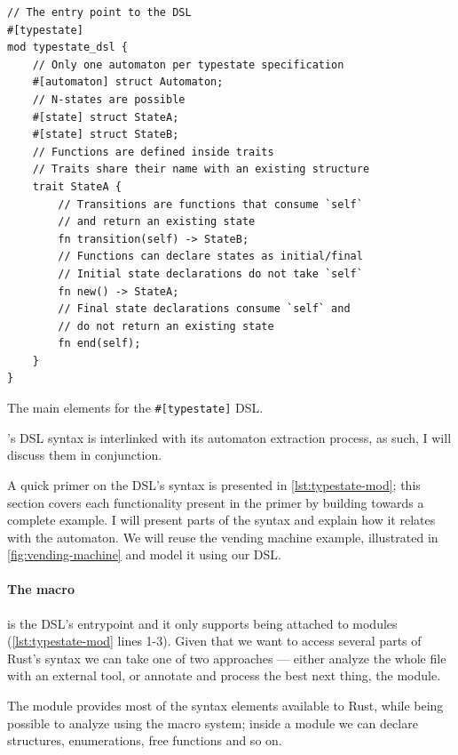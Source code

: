 \begin{listing}
    \begin{verbatim}
// The entry point to the DSL
#[typestate]
mod typestate_dsl {
    // Only one automaton per typestate specification
    #[automaton] struct Automaton;
    // N-states are possible
    #[state] struct StateA;
    #[state] struct StateB;
    // Functions are defined inside traits
    // Traits share their name with an existing structure
    trait StateA {
        // Transitions are functions that consume `self`
        // and return an existing state
        fn transition(self) -> StateB;
        // Functions can declare states as initial/final
        // Initial state declarations do not take `self`
        fn new() -> StateA;
        // Final state declarations consume `self` and
        // do not return an existing state
        fn end(self);
    }
}
    \end{verbatim}
    \caption{The main elements for the \texttt{\#[typestate]} DSL.}
    \label{lst:typestate-mod}
\end{listing}

\textcolor{attrgreen}{}'s DSL syntax is interlinked with its automaton extraction process,
as such, I will discuss them in conjunction.

A quick primer on the DSL's syntax is presented in \autoref{lst:typestate-mod};
this section covers each functionality present in the primer by building towards a complete example.
I will present parts of the syntax and explain how it relates with the automaton.
We will reuse the vending machine example, illustrated in \autoref{fig:vending-machine} and model it using our DSL.

\paragraph{The  macro} is the DSL's entrypoint and it only supports being attached to modules (\autoref{lst:typestate-mod} lines 1-3).
Given that we want to access several parts of Rust's syntax  we can take one of two approaches ---
either analyze the whole file with an external tool, or annotate and process the best next thing, the module.

The module provides most of the syntax elements available to  Rust,
while being possible to analyze using the macro system;
inside a module we can declare structures, enumerations, free functions and so on.

